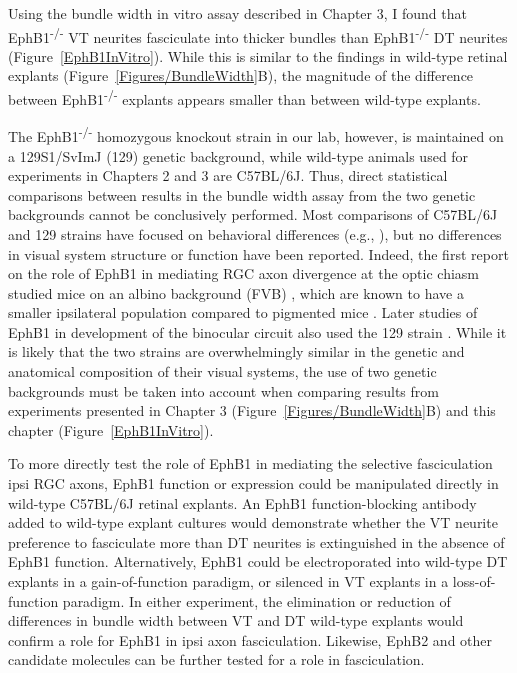 \label{sec:EphB1Fascic}
Using the bundle width in vitro assay described in Chapter 3, I found that EphB1\textsuperscript{-/-} VT neurites fasciculate into thicker bundles than EphB1\textsuperscript{-/-} DT neurites (Figure~\ref{EphB1InVitro}).
While this is similar to the findings in wild-type retinal explants (Figure~\ref{Figures/BundleWidth}B), the magnitude of the difference between EphB1\textsuperscript{-/-} explants appears smaller than between wild-type explants.

The EphB1\textsuperscript{-/-} homozygous knockout strain in our lab, however, is maintained on a 129S1/SvImJ (129) genetic background, while wild-type animals used for experiments in Chapters 2 and 3 are C57BL/6J.
Thus, direct statistical comparisons between results in the bundle width assay from the two genetic backgrounds cannot be conclusively performed.
Most comparisons of C57BL/6J and 129 strains have focused on behavioral differences (e.g., ), but no differences in visual system structure or function have been reported.
Indeed, the first report on the role of EphB1 in mediating RGC axon divergence at the optic chiasm studied mice on an albino background (FVB) \cite{williams2003ephrin}, which are known to have a smaller ipsilateral population compared to pigmented mice \cite{guillery1996albinos}.
Later studies of EphB1 in development of the binocular circuit also used the 129 strain \cite{rebsam2009switching}. 
While it is likely that the two strains are overwhelmingly similar in the genetic and anatomical composition of their visual systems, the use of two genetic backgrounds must be taken into account when comparing results from experiments presented in Chapter 3 (Figure~\ref{Figures/BundleWidth}B) and this chapter (Figure~\ref{EphB1InVitro}).

To more directly test the role of EphB1 in mediating the selective fasciculation ipsi RGC axons, EphB1 function or expression could be manipulated directly in wild-type C57BL/6J retinal explants.
An EphB1 function-blocking antibody added to wild-type explant cultures would demonstrate whether the VT neurite preference to fasciculate more than DT neurites is extinguished in the absence of EphB1 function.
Alternatively, EphB1 could be electroporated into wild-type DT explants in a gain-of-function paradigm, or silenced in VT explants in a loss-of-function paradigm.
In either experiment, the elimination or reduction of differences in bundle width between VT and DT wild-type explants would confirm a role for EphB1 in ipsi axon fasciculation.
Likewise, EphB2 and other candidate molecules can be further tested for a role in fasciculation.

